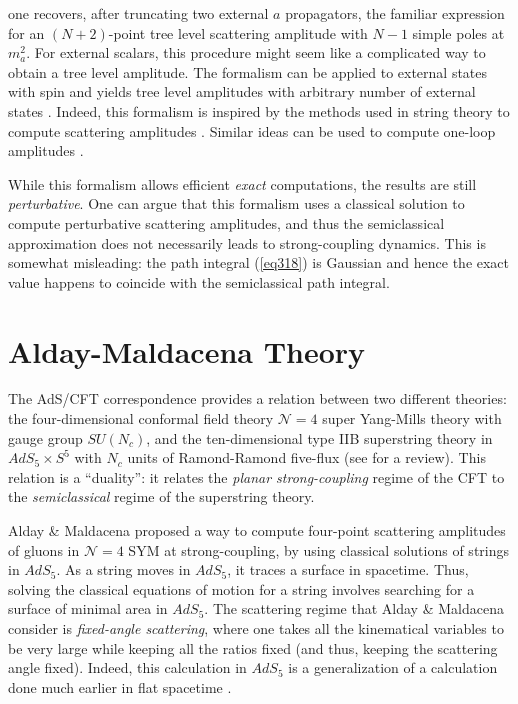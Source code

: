 one recovers, after truncating two external $a$ propagators, the familiar expression for an $(N+2)$-point tree level scattering amplitude with $N - 1$ simple poles at $m_{a}^{2}$. For external scalars, this procedure might seem like a complicated way to obtain a tree level amplitude. The formalism can be applied to external states with spin and yields tree level amplitudes with arbitrary number of external states \cite{Kosower:1987ic}. Indeed, this formalism is inspired by the methods used in string theory to compute scattering amplitudes \cite{GSW1,Polchinski1,Fields}. Similar ideas can be used to compute one-loop amplitudes \cite{
Bern:1990cu,Bern:1991aq,Bern:1991an,Roland:1992cc,Strassler:1992zr,Schubert:2001he}.

While this formalism allows efficient \textit{exact} computations, the results are still \textit{perturbative}. One can argue that this formalism uses a classical solution to compute perturbative scattering amplitudes, and thus the semiclassical approximation does not necessarily leads to strong-coupling dynamics. This is somewhat misleading: the path integral (\ref{eq318}) is Gaussian and hence the exact value happens to coincide with the semiclassical path integral.
\section{Alday-Maldacena Theory}
The AdS/CFT correspondence \cite{Maldacena:1997re} provides a relation between two different theories: the four-dimensional conformal field theory $\mathcal{N} = 4$ super Yang-Mills theory with gauge group $SU(N_{c})$, and the ten-dimensional type IIB superstring theory in $AdS_{5} \times S^{5}$ with $N_{c}$ units of Ramond-Ramond five-flux (see \cite{Aharony:1999ti} for a review). This relation is a ``duality'': it relates the \textit{planar strong-coupling} regime of the CFT to the \textit{semiclassical} regime of the superstring theory.

Alday \& Maldacena \cite{Alday:2007hr} proposed a way to compute four-point scattering amplitudes of gluons in $\mathcal{N} = 4$ SYM at strong-coupling, by using classical solutions of strings in $AdS_{5}$. As a string moves in $AdS_{5}$, it traces a surface in spacetime. Thus, solving the classical equations of motion for a string involves searching for a surface of minimal area in $AdS_{5}$. The scattering regime that Alday \& Maldacena consider is \textit{fixed-angle scattering}, where one takes all the kinematical variables to be very large while keeping all the ratios fixed (and thus, keeping the scattering angle fixed). Indeed, this calculation in $AdS_{5}$ is a generalization of a calculation done much earlier in flat spacetime \cite{Gross:1987kza,Gross:1987ar,Gross:1989ge}.

